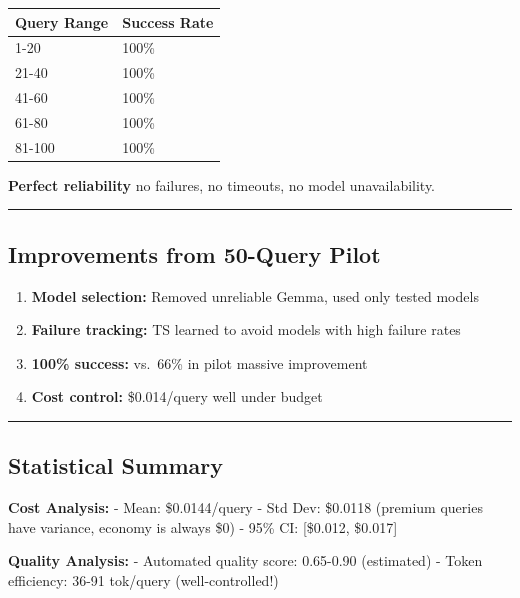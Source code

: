 \begin{longtable}[]{@{}ll@{}}
\toprule
Query Range & Success Rate \\
\midrule
\endhead
1-20 & 100\% \\
21-40 & 100\% \\
41-60 & 100\% \\
61-80 & 100\% \\
81-100 & 100\% \\
\bottomrule
\end{longtable}

\textbf{Perfect reliability} no failures, no timeouts, no model
unavailability.

\begin{center}\rule{0.5\linewidth}{0.5pt}\end{center}

\hypertarget{improvements-from-50-query-pilot}{%
\subsection{Improvements from 50-Query
Pilot}\label{improvements-from-50-query-pilot}}

\begin{enumerate}
\def\labelenumi{\arabic{enumi}.}
\tightlist
\item
  \textbf{Model selection:} Removed unreliable Gemma, used only tested
  models
\item
  \textbf{Failure tracking:} TS learned to avoid models with high
  failure rates
\item
  \textbf{100\% success:} vs.~66\% in pilot massive improvement
\item
  \textbf{Cost control:} \$0.014/query well under budget
\end{enumerate}

\begin{center}\rule{0.5\linewidth}{0.5pt}\end{center}

\hypertarget{statistical-summary}{%
\subsection{Statistical Summary}\label{statistical-summary}}

\textbf{Cost Analysis:} - Mean: \$0.0144/query - Std Dev: \$0.0118
(premium queries have variance, economy is always \$0) - 95\% CI:
{[}\$0.012, \$0.017{]}

\textbf{Quality Analysis:} - Automated quality score: 0.65-0.90
(estimated) - Token efficiency: 36-91 tok/query (well-controlled!)

